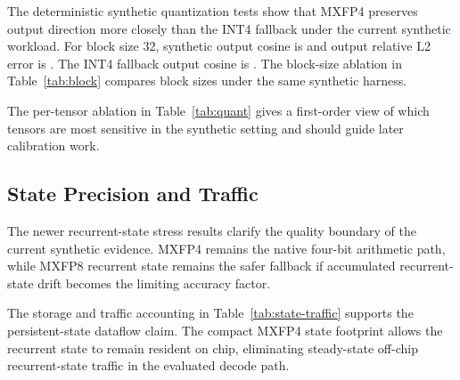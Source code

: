 \documentclass[conference]{IEEEtran}
\newcommand{\PaperRoot}{}
\renewcommand{\PaperRoot}{paper/}%
\renewcommand{\PaperRoot}{}%
\newcommand{\PaperInput}[1]{}
\begin{document}
The deterministic synthetic quantization tests show that MXFP4 preserves output
direction more closely than the INT4 fallback under the current synthetic
workload. For block size 32, synthetic output cosine is
\SyntheticMxfpFourBThirtyTwoOutputCosine and output relative L2 error is
\SyntheticMxfpFourBThirtyTwoOutputRelLTwo. The INT4 fallback output cosine is
\SyntheticIntFourOutputCosine. The block-size ablation in
Table~\ref{tab:block} compares block sizes under the same synthetic harness.

\begin{table}[t]
  \centering
  \caption{Synthetic block-size ablation. These values do not replace
  full-model quality measurements.}
  \label{tab:block}
  \PaperInput{tables/ablation_block_size.tex}
\end{table}

The per-tensor ablation in Table~\ref{tab:quant} gives a first-order view of
which tensors are most sensitive in the synthetic setting and should guide
later calibration work.

\begin{table}[t]
  \centering
  \caption{Synthetic per-tensor quantization ablation.}
  \label{tab:quant}
  \PaperInput{tables/ablation_quantization.tex}
\end{table}

\subsection{State Precision and Traffic}

The newer recurrent-state stress results clarify the quality boundary of the
current synthetic evidence. MXFP4 remains the native four-bit arithmetic path,
while MXFP8 recurrent state remains the safer fallback if accumulated
recurrent-state drift becomes the limiting accuracy factor.

\begin{table}[t]
  \centering
  \caption{Synthetic recurrent-state stress evidence.}
  \label{tab:state-stress}
  \resizebox{\linewidth}{!}{\PaperInput{tables/recurrent_state_stress.tex}}
\end{table}

The storage and traffic accounting in Table~\ref{tab:state-traffic} supports
the persistent-state dataflow claim. The compact MXFP4 state footprint allows
the recurrent state to remain resident on chip, eliminating steady-state
off-chip recurrent-state traffic in the evaluated decode path.

\begin{table}[t]
  \centering
  \caption{Recurrent-state storage and off-chip traffic accounting for MXFP4
  $B=32$.}
  \label{tab:state-traffic}
  \resizebox{\linewidth}{!}{\PaperInput{tables/state_storage_traffic.tex}}
\end{table}
\end{document}
